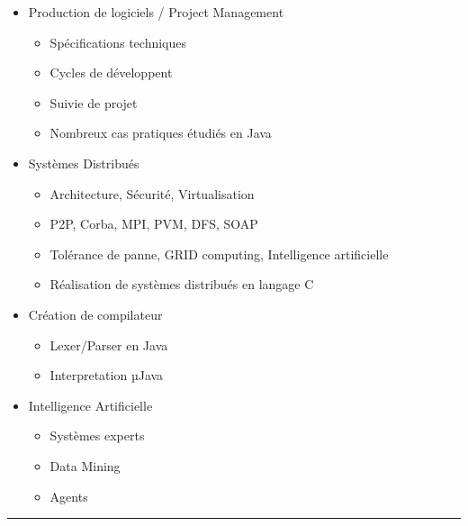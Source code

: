 \documentclass[a4paper,10pt]{article}
\begin{document}
\begin{itemize}
\begin{itemize}
			\item Production de logiciels / Project Management
				\begin{itemize}
					\item Spécifications techniques
					\item Cycles de développent
					\item Suivie de projet
					\item Nombreux cas pratiques étudiés en Java
				\end{itemize}
				\item Systèmes Distribués
				\begin{itemize}
					\item Architecture, Sécurité, Virtualisation
					\item P2P, Corba, MPI, PVM, DFS, SOAP
					\item Tolérance de panne, GRID computing, Intelligence artificielle
					\item Réalisation de systèmes distribués en langage C
				\end{itemize}
			\item Création de compilateur
				\begin{itemize}
					\item Lexer/Parser en Java
					\item Interpretation µJava
				\end{itemize}
			\item Intelligence Artificielle
				\begin{itemize}
					\item Systèmes experts
					\item Data Mining
					\item Agents
				\end{itemize}
		\end{itemize}
\end{itemize}

\bigskip
\hrule
\bigskip


\end{document}
